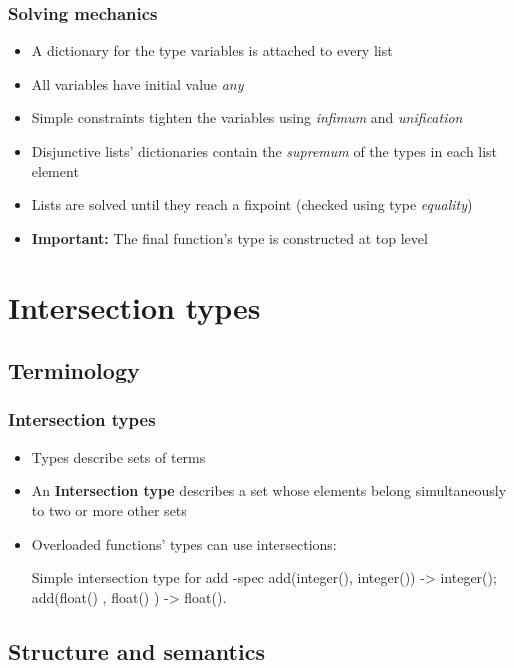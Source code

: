 \documentclass{beamer}
\begin{document}
\begin{frame}
  \frametitle{Solving mechanics}
  \begin{itemize}
  \item A dictionary for the type variables is attached to every
    list
  \item All variables have initial value \emph{any} \pause
  \item Simple constraints tighten the variables using \emph{infimum}
    and \emph{unification} \pause
  \item Disjunctive lists' dictionaries contain the \emph{supremum} of
    the types in each list element \pause
  \item Lists are solved until they reach a fixpoint (checked using
    type \emph{equality}) \pause
  \item \textbf{Important:} The final function's type is constructed
    at top level
  \end{itemize}
\end{frame}

\section{Intersection types}

\subsection{Terminology}

\begin{frame}[fragile]
  \frametitle{Intersection types}
  \begin{itemize}
  \item Types describe sets of terms
  \item An \textbf{Intersection type} describes a set whose elements
    belong simultaneously to two or more other sets
  \item Overloaded functions' types can use intersections:
    \begin{code}{Simple intersection type for add}
-spec add(integer(), integer()) -> integer();
      add(float()  , float()  ) -> float().
    \end{code}
  \end{itemize}
\end{frame}

\subsection{Structure and semantics}
\end{document}
